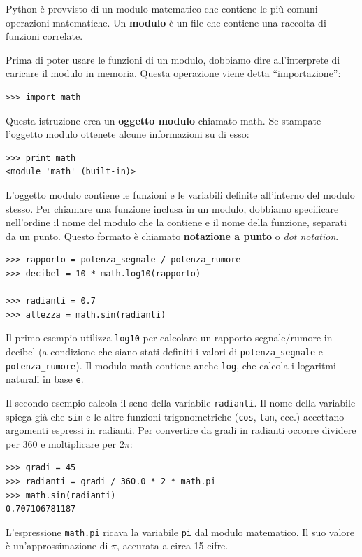 \documentclass[10pt]{book}
\begin{document}
Python è provvisto di un modulo matematico che contiene le più comuni operazioni matematiche. Un {\bf modulo} è un file che contiene una raccolta di funzioni correlate.

Prima di poter usare le funzioni di un modulo, dobbiamo dire all'interprete di caricare il modulo in memoria. Questa operazione viene detta ``importazione'':

\begin{verbatim}
>>> import math
\end{verbatim}
%
Questa istruzione crea un {\bf oggetto modulo} chiamato math. Se stampate l'oggetto modulo ottenete alcune informazioni su di esso:

\begin{verbatim}
>>> print math
<module 'math' (built-in)>
\end{verbatim}
%
L'oggetto modulo contiene le funzioni e le variabili definite all'interno del modulo stesso. Per chiamare una funzione inclusa in un modulo, dobbiamo specificare nell'ordine il nome del modulo che la contiene e il nome della funzione, separati da un punto. Questo formato è chiamato {\bf notazione a punto} o {\em dot notation}.

\begin{verbatim}
>>> rapporto = potenza_segnale / potenza_rumore
>>> decibel = 10 * math.log10(rapporto)

>>> radianti = 0.7
>>> altezza = math.sin(radianti)
\end{verbatim}
%
Il primo esempio utilizza \verb"log10" per calcolare un rapporto segnale/rumore in decibel (a condizione che siano stati definiti i valori di \verb"potenza_segnale" e \verb"potenza_rumore").  Il modulo math contiene anche {\tt log}, che calcola i logaritmi naturali in base {\tt e}.

Il secondo esempio calcola il seno della variabile {\tt radianti}. Il nome della variabile spiega già che {\tt sin} e le altre funzioni trigonometriche ({\tt cos}, {\tt tan}, ecc.) accettano argomenti espressi in radianti. Per convertire da gradi in radianti occorre dividere per 360 e moltiplicare per $2 \pi$:

\begin{verbatim}
>>> gradi = 45
>>> radianti = gradi / 360.0 * 2 * math.pi
>>> math.sin(radianti)
0.707106781187
\end{verbatim}
%
L'espressione {\tt math.pi} ricava la variabile {\tt pi} dal modulo matematico. Il suo valore è un'approssimazione di $\pi$, accurata a circa 15 cifre. 
\end{document}
